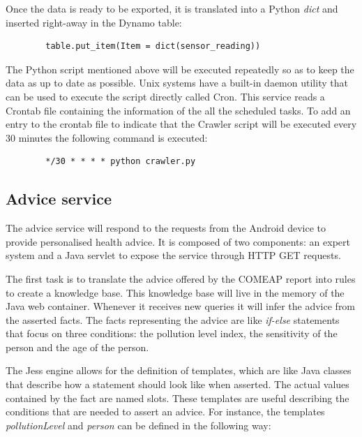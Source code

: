 Once the data is ready to be exported, it is translated into a Python \textit{dict} and inserted right-away in the Dynamo table: \bigskip

{\centering
\begin{BVerbatim}
        table.put_item(Item = dict(sensor_reading))
\end{BVerbatim}
\par
}\bigskip


The Python script mentioned above will be executed repeatedly so as to keep the data as up to date as possible. Unix systems have a built-in daemon utility that can be used to execute the script directly called Cron. This service reads a Crontab file containing the information of the all the scheduled tasks. To add an entry to the crontab file to indicate that the Crawler script will be executed every 30 minutes the following command is executed: \bigskip

{\centering
\begin{BVerbatim}
        */30 * * * * python crawler.py
\end{BVerbatim}
\par
}

\subsection{Advice service}
The advice service will respond to the requests from the Android device to provide personalised health advice. It is composed of two components: an expert system and a Java servlet to expose the service through HTTP GET requests. 

The first task is to translate the advice offered by the COMEAP report into rules to create a knowledge base. This knowledge base will live in the memory of the Java web container. Whenever it receives new queries it will infer the advice from the asserted facts. The facts representing the advice are like \textit{if-else} statements that focus on three conditions: the pollution level index, the sensitivity of the person and the age of the person. 

The Jess engine allows for the definition of templates, which are like Java classes that describe how a statement should look like when asserted. The actual values contained by the fact are named slots. These templates are useful describing the conditions that are needed to assert an advice. For instance, the templates \textit{pollutionLevel} and \textit{person} can be defined in the following way: 

